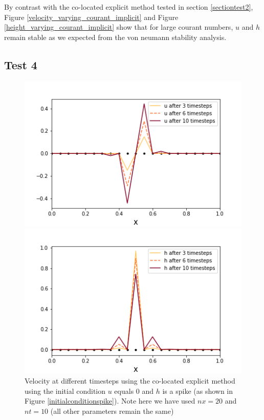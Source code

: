 \documentclass[a4paper,12pt, notitlepage]{article}
\begin{document}
By contrast with the co-located explicit method tested in section \ref{sectiontest2}, Figure \ref{velocity_varying_courant_implicit} and Figure \ref{height_varying_courant_implicit} show that for large courant numbers, $u$ and $h$ remain stable as we expected from the von neumann stability analysis.

\subsection{Test 4}\label{subsectiontest4}

\begin{figure} [H]
	\begin{minipage}{.5\textwidth}
		\ContinuedFloat*
		\captionsetup{width=0.9\textwidth}
		\captionsetup{justification=centering}
		\includegraphics[width=\textwidth]{velocity_colocated_explicit_spike.png}
		\caption{\label{velocity_colocated_explicit_spike} Velocity at different timesteps using the co-located explicit method using the initial condition $u$ equals 0 and $h$ is a spike (as shown in Figure \ref{initialconditionspike}). Note here we have used $nx = 20$ and $nt = 10$ (all other parameters remain the same)} 
	\end{minipage}
	\begin{minipage}{.5\textwidth}
		\ContinuedFloat
		\captionsetup{width=0.9\textwidth}
		\captionsetup{justification=centering}
		\includegraphics[width=\textwidth]{height_colocated_explicit_spike.png}

\end{minipage}
\end{figure}
\end{document}
